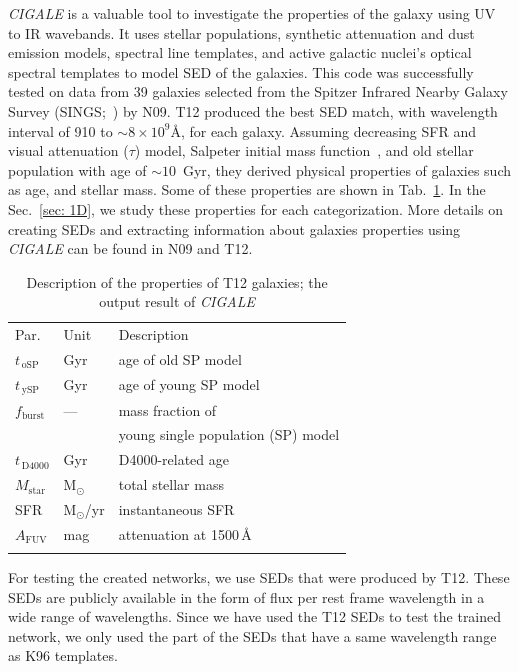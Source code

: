     {\em CIGALE} is a valuable tool to investigate the properties of the galaxy using UV to IR wavebands.
    It uses stellar populations, synthetic attenuation and dust emission models, spectral line templates, and active galactic nuclei's optical spectral templates to model SED of the galaxies.
    This code was successfully tested on data from 39 galaxies selected from the Spitzer Infrared Nearby Galaxy Survey (SINGS;~\citep{Kennicutt03}) by N09.
    T12 produced the best SED match, with wavelength interval of 910 to $\sim 8\times10^9$\AA, for each galaxy.
    Assuming decreasing SFR and visual attenuation ($\tau$) model, Salpeter initial mass function~\citep{Salpeter55}, and old stellar population with age of $\sim 10$~Gyr, they derived physical properties of galaxies such as age, and stellar mass.
    Some of these properties are shown in Tab.~\ref{tab: props}.
    In the Sec.~\ref{sec: 1D}, we study these properties for each categorization.
    More details on creating SEDs and extracting information about galaxies properties using {\em CIGALE} can be found in N09 and T12.
    
       
    \begin{table}
\caption[]{Description of the properties of T12 galaxies; the output result of {\em CIGALE}}     
\label{tab: props}
\centering
\begin{tabular}{l l l}
\hline\hline
\noalign{\smallskip}
Par. & Unit & Description\\
\noalign{\smallskip}
\hline
\noalign{\smallskip}
$t_{\,\mathrm{oSP}}$ & Gyr & age of old SP model \\
$t_{\,\mathrm{ySP}}$ & Gyr & age of young SP model \\
$f_\mathrm{burst}$ & --- & mass fraction of \\
& & young single population (SP) model \\
\noalign{\smallskip}
$t_{\,\mathrm{D4000}}$ & Gyr & D4000-related age \\
\noalign{\smallskip}
$M_\mathrm{star}$ & M$_\odot$ & total stellar mass  \\
SFR & M$_\odot$/yr & instantaneous SFR  \\
$A_\mathrm{FUV}$ & mag & attenuation at 1500\,\AA{} \\
\noalign{\smallskip}
\hline
\end{tabular}
\end{table}

    For testing the created networks, we use SEDs that were produced by T12. 
    These SEDs are publicly available in the form of flux per rest frame wavelength in a wide range of wavelengths.
    Since we have used the T12 SEDs to test the trained network, we only used the part of the SEDs that have a same wavelength range as K96 templates.  
 
